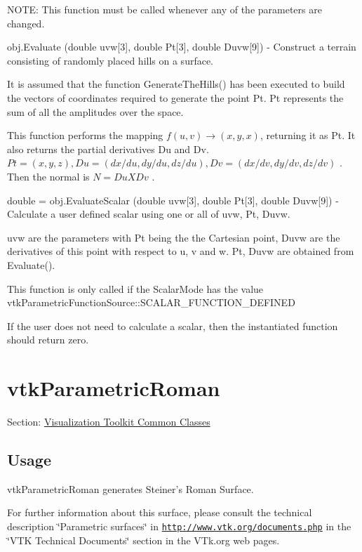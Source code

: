 \begin{DoxyItemize}
N\-O\-T\-E\-: This function must be called whenever any of the parameters are changed.  
\item {\ttfamily obj.\-Evaluate (double uvw\mbox{[}3\mbox{]}, double Pt\mbox{[}3\mbox{]}, double Duvw\mbox{[}9\mbox{]})} -\/ Construct a terrain consisting of randomly placed hills on a surface.

It is assumed that the function Generate\-The\-Hills() has been executed to build the vectors of coordinates required to generate the point Pt. Pt represents the sum of all the amplitudes over the space.

This function performs the mapping $f(u,v) \rightarrow (x,y,x)$, returning it as Pt. It also returns the partial derivatives Du and Dv. $Pt = (x, y, z), Du = (dx/du, dy/du, dz/du), Dv = (dx/dv, dy/dv, dz/dv)$ . Then the normal is $N = Du X Dv$ .  
\item {\ttfamily double = obj.\-Evaluate\-Scalar (double uvw\mbox{[}3\mbox{]}, double Pt\mbox{[}3\mbox{]}, double Duvw\mbox{[}9\mbox{]})} -\/ Calculate a user defined scalar using one or all of uvw, Pt, Duvw.

uvw are the parameters with Pt being the the Cartesian point, Duvw are the derivatives of this point with respect to u, v and w. Pt, Duvw are obtained from Evaluate().

This function is only called if the Scalar\-Mode has the value vtk\-Parametric\-Function\-Source\-::\-S\-C\-A\-L\-A\-R\-\_\-\-F\-U\-N\-C\-T\-I\-O\-N\-\_\-\-D\-E\-F\-I\-N\-E\-D

If the user does not need to calculate a scalar, then the instantiated function should return zero.


\end{DoxyItemize}\hypertarget{vtkcommon_vtkparametricroman}{}\section{vtk\-Parametric\-Roman}\label{vtkcommon_vtkparametricroman}
Section\-: \hyperlink{sec_vtkcommon}{Visualization Toolkit Common Classes} \hypertarget{vtkwidgets_vtkxyplotwidget_Usage}{}\subsection{Usage}\label{vtkwidgets_vtkxyplotwidget_Usage}
vtk\-Parametric\-Roman generates Steiner's Roman Surface.

For further information about this surface, please consult the technical description \char`\"{}\-Parametric surfaces\char`\"{} in \href{http://www.vtk.org/documents.php}{\tt http\-://www.\-vtk.\-org/documents.\-php} in the \char`\"{}\-V\-T\-K Technical Documents\char`\"{} section in the V\-Tk.\-org web pages.

